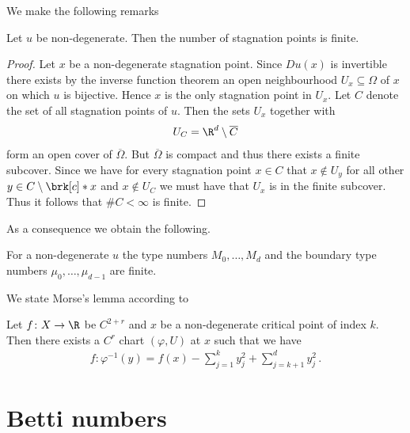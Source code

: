We make the following remarks
\begin{proposition}\label{pr:finiteness_critical_points}
  Let $u$ be non-degenerate. Then the number of
  stagnation points is finite.
\end{proposition}
\begin{proof}
  Let $x$ be a non-degenerate stagnation point. Since $Du(x)$ is invertible there exists
  by the inverse function theorem an open neighbourhood $U_x\subseteq\Omega$ of $x$ on which 
  $u$ is bijective. Hence $x$ is the only stagnation point in $U_x$. Let $C$ denote the set of all
  stagnation points of $u$. Then the sets $U_x$ together with
  \begin{align}
    U_C=\R^d\setminus \overline{C}
  \end{align}
  form an open cover of $\overline{\Omega}$. But $\overline{\Omega}$ is compact and thus there exists
  a finite subcover. Since we have for every stagnation point $x\in C$ that
  $x\not\in U_y$ for all other $y\in C\setminus\brk[c]*{x}$ and $x\not\in U_C$ we must have that $U_x$
  is in the finite subcover. Thus it follows that $\#C<\infty$ is finite.
\end{proof}
As a consequence we obtain the following.
\begin{corollary}
  For a non-degenerate $u$ the type numbers $M_0,\dots,M_d$ and the boundary type numbers $\mu_0,\dots,\mu_{d-1}$
  are finite.
\end{corollary}


We state Morse's lemma according to \cite[p.145]{Hirsch1994}
\begin{lemma}
  Let $f\colon X\to\R$ be $C^{2+r}$ and $x$ be a non-degenerate
  critical point of index $k$. Then there exists a $C^r$ chart $(\varphi,U)$ at $x$
  such that we have
  \begin{align*}
    f\colon\varphi^{-1}(y)=f(x)-\sum_{j=1}^ky_j^2+\sum_{j=k+1}^dy_j^2\,.
  \end{align*}
\end{lemma}


\section{Betti numbers}

